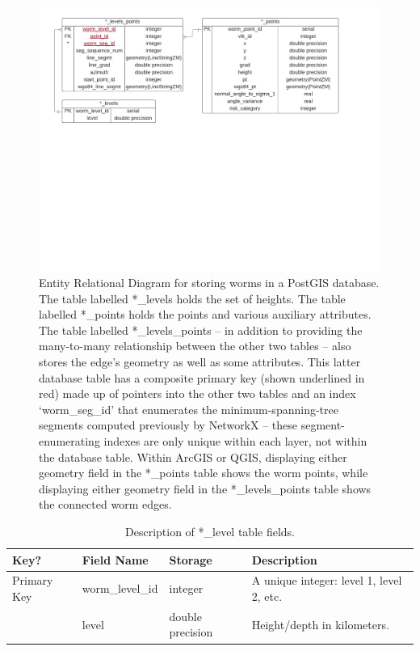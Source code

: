 \documentclass[extra]{article}
\begin{document}
\begin{figure}
\includegraphics[width=0.90\linewidth]{WormERD.pdf}
\caption{Entity Relational Diagram for storing worms in a PostGIS database. The table labelled *\_levels holds the set of heights. The table labelled *\_points holds the points and various auxiliary attributes. The table labelled *\_levels\_points -- in addition to providing the many-to-many relationship between the other two tables -- also stores the edge's geometry as well as some attributes. This latter database table has a composite primary key (shown underlined in red) made up of pointers into the other two tables and an index `worm\_seg\_id' that enumerates the minimum-spanning-tree segments computed previously by NetworkX -- these segment-enumerating indexes are only unique within each layer, not within the database table. Within ArcGIS or QGIS, displaying either geometry field in the *\_points table shows the worm points, while displaying either geometry field in the *\_levels\_points table shows the connected worm edges.}
\label{fig:WormERD}
\end{figure}

\begin{table}[]
\centering
\caption{Description of *\_level table fields.}
\label{tab:LevelFields}
\begin{tabular}{|l|l|l|l|}
\hline
Key?        & Field Name      & Storage          & Description                              \\ \hline
Primary Key & worm\_level\_id & integer          & A unique integer: level 1, level 2, etc. \\ \hline
            & level           & double precision & Height/depth in kilometers.              \\ \hline
\end{tabular}
\end{table}
\end{document}
